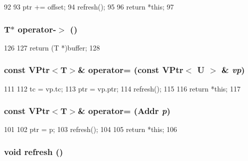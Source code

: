 \begin{DoxyCode}
92     {
93         ptr += offset;
94         refresh();
95 
96         return *this;
97     }
\end{DoxyCode}
\hypertarget{classVPtr_af6e485beee07fd401de29c8cdf898c69}{
\subsubsection[{operator-\/$>$}]{\setlength{\rightskip}{0pt plus 5cm}T$\ast$ operator-\/$>$ ()}}
\label{classVPtr_af6e485beee07fd401de29c8cdf898c69}



\begin{DoxyCode}
126     {
127         return (T *)buffer;
128     }
\end{DoxyCode}
\hypertarget{classVPtr_a89bf8629365349f439c0a899d0080a3b}{
\subsubsection[{operator=}]{\setlength{\rightskip}{0pt plus 5cm}const {\bf VPtr}$<$T$>$\& operator= (const {\bf VPtr}$<$ U $>$ \& {\em vp})}}
\label{classVPtr_a89bf8629365349f439c0a899d0080a3b}



\begin{DoxyCode}
111     {
112         tc = vp.tc;
113         ptr = vp.ptr;
114         refresh();
115 
116         return *this;
117     }
\end{DoxyCode}
\hypertarget{classVPtr_a5d3116f4217a75c4bc6b499dbf50ea6e}{
\subsubsection[{operator=}]{\setlength{\rightskip}{0pt plus 5cm}const {\bf VPtr}$<$T$>$\& operator= ({\bf Addr} {\em p})}}
\label{classVPtr_a5d3116f4217a75c4bc6b499dbf50ea6e}



\begin{DoxyCode}
101     {
102         ptr = p;
103         refresh();
104 
105         return *this;
106     }
\end{DoxyCode}
\hypertarget{classVPtr_a5f2e190b8261a98c97c2ea4e86670d54}{
\subsubsection[{refresh}]{\setlength{\rightskip}{0pt plus 5cm}void refresh ()}}
\label{classVPtr_a5f2e190b8261a98c97c2ea4e86670d54}



